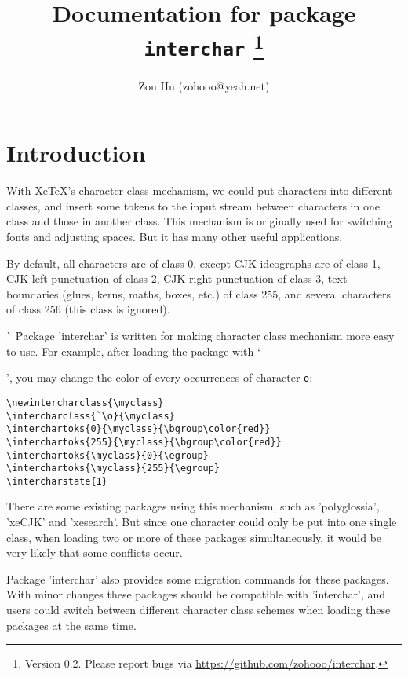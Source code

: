 \documentclass{article}
\begin{document}
\title{Documentation for package \texttt{interchar}
\footnote{Version 0.2. Please report bugs via \url{https://github.com/zohooo/interchar}.}}
\author{Zou Hu (zohooo@yeah.net)}
\maketitle
\tableofcontents

\section{Introduction}

With XeTeX\rq s character class mechanism, we could put characters into different classes,
and insert some tokens to the input stream between characters in one class and those in
another class. This mechanism is originally used for switching fonts and adjusting spaces.
But it has many other useful applications.

By default, all characters are of class 0, except CJK ideographs are of class 1, CJK left
punctuation of class 2, CJK right punctuation of class 3, text boundaries (glues, kerns,
maths, boxes, etc.) of class 255, and several characters of class 256 (this class is ignored).

\MakeNormal\`
\newintercharclass{\myclass}
\MakeActive\`
Package 'interchar' is written for making character class mechanism more easy to use. For example,
after loading the package with `\usepackage{interchar}', you may change the color of every
occurrences of character \texttt{o}:
\begin{verbatim}
\newintercharclass{\myclass}
\intercharclass{`\o}{\myclass}
\interchartoks{0}{\myclass}{\bgroup\color{red}}
\interchartoks{255}{\myclass}{\bgroup\color{red}}
\interchartoks{\myclass}{0}{\egroup}
\interchartoks{\myclass}{255}{\egroup}
\intercharstate{1}
\end{verbatim}

There are some existing packages using this mechanism, such as 'polyglossia', 'xeCJK' and
'xesearch'. But since one character could only be put into one single class, when loading two
or more of these packages simultaneously, it would be very likely that some conflicts occur.

Package 'interchar' also provides some migration commands for these packages. With minor changes
these packages should be compatible with 'interchar', and users could switch between different
character class schemes when loading these packages at the same time.
\end{document}
